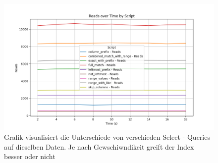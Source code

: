 \begin{figure}[!ht]
    \centering
    \includegraphics[width=.8\textwidth]{PNGs/Index/B-Tree/Query_Reads}
    \caption[B - Tree - Selects - Ergebnis]{Grafik visualisiert die Unterschiede von verschieden Select - Queries auf dieselben Daten. Je nach Gewschiwndikeit greift der Index besser oder nicht }
    \label{fig:b-tree-query-reads}
\end{figure}